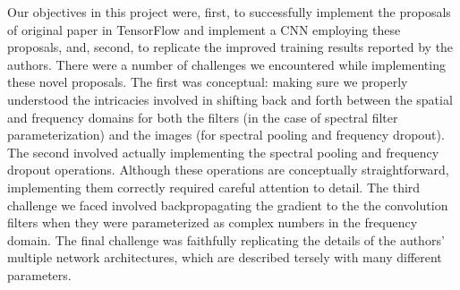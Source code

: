 \documentclass[10pt,journal,compsoc]{IEEEtran}
\begin{document}
Our objectives in this project were, first, to successfully implement the proposals of original paper in TensorFlow and implement a CNN employing these proposals, and, second, to replicate the improved training results reported by the authors. There were a number of challenges we encountered while implementing these novel proposals. The first was conceptual: making sure we properly understood the intricacies involved in shifting back and forth between the spatial and frequency domains for both the filters (in the case of spectral filter parameterization) and the images (for spectral pooling and frequency dropout). The second involved actually implementing the spectral pooling and frequency dropout operations. Although these operations are conceptually straightforward, implementing them correctly required careful attention to detail. The third challenge we faced involved backpropagating the gradient to the the convolution filters when they were parameterized as complex numbers in the frequency domain. The final challenge was faithfully replicating the details of the authors' multiple network architectures, which are described tersely with many different parameters.

%
%

\end{document}
